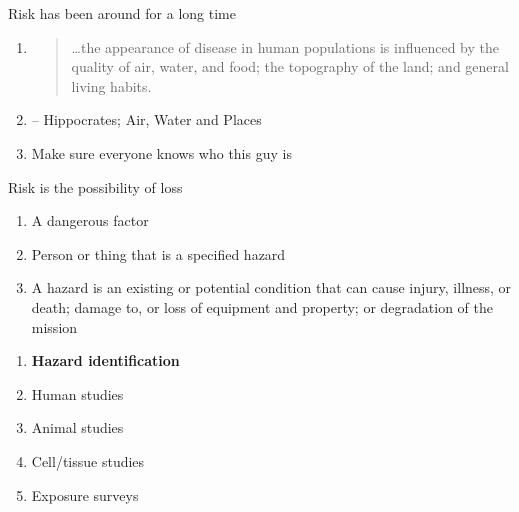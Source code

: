\documentclass[aspectratio=1610,pdftex,dvipsnames,compress,xcolor={dvipsnames}]{beamer}
\begin{document}
\addtocounter{framenumber}{-1}
\begin{frame}{Risk has been around for a long time}
    \begin{enumerate}[series=outerlist,topsep=0pt,itemsep=21pt,leftmargin=*,label=(\arabic*)]
        \item[]
            \begin{quote}
                \ldots the appearance of disease in human populations is influenced by the quality of air, water, and food; the topography of the land; and general living habits.
            \end{quote}
        \item[]-- Hippocrates; Air, Water and Places
        \item[]Make sure everyone knows who this guy is
    \end{enumerate}
\end{frame}


\begin{frame}{Risk is the possibility of loss}
    \begin{enumerate}[series=outerlist,topsep=0pt,itemsep=15pt,leftmargin=*,label=(\arabic*)]
        \item[]A dangerous factor
        \item[]Person or thing that is a specified hazard
        \item[]A hazard is an existing or potential condition that can cause injury, illness, or death; damage to, or loss of equipment and property; or degradation of the mission
    \end{enumerate}

    \vspace{0.25in}
    
    \begin{enumerate}[series=outerlist,topsep=0pt,itemsep=1pt,leftmargin=*,label=(\arabic*)]
        \item[]\textbf{Hazard identification}
        \item[]Human studies
        \item[]Animal studies
        \item[]Cell/tissue studies  
        \item[]Exposure surveys
    \end{enumerate}
\end{frame}
\end{document}
